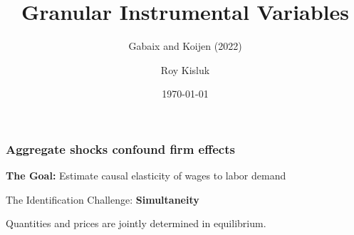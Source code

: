 \documentclass[aspectratio=169,11pt]{beamer}
\begin{document}
\begin{frame}
    \title{Granular Instrumental Variables}
    \subtitle{Gabaix and Koijen (2022)}
    \author{Roy Kisluk}
    \date{\today}
    \titlepage
\end{frame}

\begin{frame}
    \frametitle{Aggregate shocks confound firm effects}

    \vspace{0.5cm}
    {\Large
        \textbf{The Goal:} Estimate causal elasticity of wages to labor demand
    }

    \vspace{0.8cm}
    {\Large
        The Identification Challenge: \textbf{Simultaneity}
    }

    \vspace{0.8cm}
    {\Large
        Quantities and prices are jointly determined in equilibrium.
    }


\end{frame}
\end{document}
